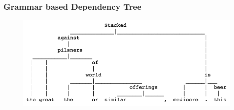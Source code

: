 
\setcounter{page}{1}

\begin{frame}
    \label{dependency_tree}
    \frametitle{Grammar based Dependency Tree}
    \begin{figure}[htb]
        \begin{center}
            \includegraphics[scale=0.35]{img/figures/dependency_tree}
        \end{center}
    \end{figure}
\begin{flushright}
\hyperlink{review_verbs}{}
\end{flushright}
\end{frame}
